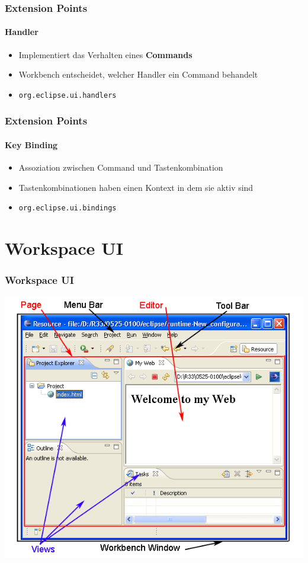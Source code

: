 {\begin{frame}
  \frametitle{Extension Points}
  \framesubtitle{Handler}
  \begin{itemize}
    \item Implementiert das Verhalten eines \textbf{Commands}
    \item Workbench entscheidet, welcher Handler ein Command behandelt
    \item \texttt{org.eclipse.ui.handlers}
  \end{itemize}
\end{frame}

\begin{frame}
  \frametitle{Extension Points}
  \framesubtitle{Key Binding}
  \begin{itemize}
    \item Assoziation zwischen Command und Tastenkombination
    \item Tastenkombinationen haben einen Kontext in dem sie aktiv sind
    \item \texttt{org.eclipse.ui.bindings}
  \end{itemize}
\end{frame}

\section{Workspace UI}
\begin{frame}
  \frametitle{Workspace UI}
  \includegraphics[scale=0.4]{images/workspace-ui.png}
\end{frame}

}
